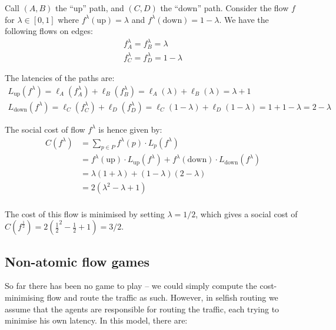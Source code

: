 Call $(A,B)$ the ``up'' path, and $(C,D)$ the ``down'' path. Consider the flow
$f$ for $\lambda \in [0,1]$ where $f^\lambda(\text{up}) = \lambda$ and
$f^\lambda(\text{down}) = 1 - \lambda$. We have the following flows on edges:
\begin{equation*}
	\begin{gathered}
		f_A^\lambda = f_B^\lambda = \lambda \\
		f_C^\lambda = f_D^\lambda = 1 - \lambda
	\end{gathered}
\end{equation*}

The latencies of the paths are:
\begin{equation*}
	\begin{gathered}
		L_\text{up}(f^\lambda) = \ell_A(f_A^\lambda) + \ell_B(f_B^\lambda) = \ell_A(\lambda) + \ell_B(\lambda) = \lambda + 1 \\
		L_\text{down}(f^\lambda) = \ell_C(f_C^\lambda) + \ell_D(f_D^\lambda) = \ell_C(1 - \lambda) + \ell_D(1 - \lambda) = 1 + 1 - \lambda = 2 - \lambda
	\end{gathered}
\end{equation*}

The social cost of flow $f^\lambda$ is hence given by:
\begin{equation*}
	\begin{split}
		C(f^\lambda) & = \sum_{p\in P} f^\lambda (p) \cdot L_p(f^\lambda) \\
		& = f^\lambda (\text{up}) \cdot L_\text{up} (f^\lambda) + f^\lambda (\text{down}) \cdot L_\text{down}(f^\lambda) \\
		& = \lambda (1 + \lambda) + (1 - \lambda) (2 - \lambda) \\
		& = 2(\lambda^2 - \lambda + 1) \\
	\end{split}
\end{equation*}

The cost of this flow is minimised by setting $\lambda = 1/2$, which gives a
social cost of $C(f^\frac{1}{2}) = 2(\frac{1}{2}^2 - \frac{1}{2} + 1) = 3/2$.

\subsection{Non-atomic flow games}

So far there has been no game to play -- we could simply compute the
cost-minimising flow and route the traffic as such. However, in selfish routing
we assume that the agents are responsible for routing the traffic, each trying
to minimise his own latency. In this model, there are:

